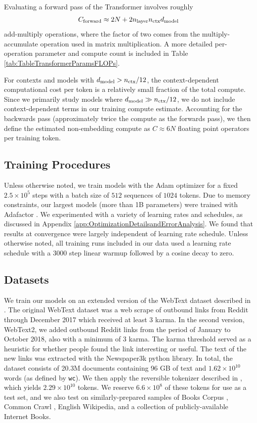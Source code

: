\documentclass[english]{article}
\newcommand{\be}{\begin{equation}}
\newcommand{\ee}{\end{equation}}
\begin{document}
Evaluating a forward pass of the Transformer involves roughly
\be
\label{eq:ApproximateTotalCompute}
C_{\rm forward} \approx 2N + 2n_{{\rm layer}}n_{{\rm ctx}}d_{{\rm model}}
\ee
add-multiply operations, where the factor of two comes from the multiply-accumulate operation used in matrix multiplication.  A more detailed per-operation parameter and compute count is included in Table \ref{tab:TableTransformerParamsFLOPs}.

For contexts and models with $d_{{\rm model}} > n_{\rm ctx} / 12$, the context-dependent computational cost per token is a relatively small fraction of the total compute.
Since we primarily study models where $d_{\rm model} \gg n_{\rm ctx}/12$, we do not include context-dependent terms in our training compute estimate.  Accounting for the backwards pass (approximately twice the compute as the forwards pass), we then define the estimated non-embedding compute as $C \approx 6 N$ floating point operators per training token.

\subsection{Training Procedures}

Unless otherwise noted, we train  models with the Adam optimizer \cite{kingma2014adam} for a fixed $2.5 \times 10^5$  steps with a batch size of $512$ sequences of $1024$ tokens.
Due to memory constraints, our largest models (more than 1B parameters) were trained with Adafactor \cite{DBLP:journals/corr/abs-1804-04235}.
We experimented with a variety of learning rates and schedules, as discussed in Appendix \ref{app:OptimizationDetailsandErrorAnalysis}.
We found that results at convergence were largely independent of learning rate schedule.  Unless otherwise noted, all training runs included in our data used a learning rate schedule with a 3000 step linear warmup followed by a cosine decay to zero.

\subsection{Datasets}
We train our models on an extended version of the WebText dataset described in \cite{radford2019language}.  The original WebText dataset was a web scrape of outbound links from Reddit through December 2017 which received at least 3 karma. In the second version, WebText2, we added outbound Reddit links from the period of January to October 2018, also with a minimum of 3 karma. The karma threshold served as a heuristic for whether people found the link interesting or useful. The text of the new links was extracted with the Newspaper3k python library. In total, the dataset consists of 20.3M documents containing 96 GB of text and $1.62 \times 10^{10}$ words (as defined by \texttt{wc}). We then apply the reversible tokenizer described in \cite{radford2019language}, which yields $2.29 \times 10^{10}$ tokens.  We reserve $6.6 \times 10^{8}$ of these tokens for use as a test set, and we also test on similarly-prepared samples of Books Corpus \cite{Zhu_2015}, Common Crawl \cite{commoncrawl}, English Wikipedia, and a collection of publicly-available Internet Books.
\end{document}

